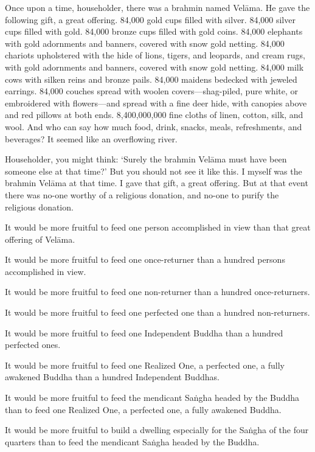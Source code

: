 \documentclass[12pt,openany]{book}%
\begin{document}
Once upon a time, householder, there was a brahmin named \textsanskrit{Velāma}. He gave the following gift, a great offering. 84,000 gold cups filled with silver. 84,000 silver cups filled with gold. 84,000 bronze cups filled with gold coins. 84,000 elephants with gold adornments and banners, covered with snow gold netting. 84,000 chariots upholstered with the hide of lions, tigers, and leopards, and cream rugs, with gold adornments and banners, covered with snow gold netting. 84,000 milk cows with silken reins and bronze pails. 84,000 maidens bedecked with jeweled earrings. 84,000 couches spread with woolen covers—shag-piled, pure white, or embroidered with flowers—and spread with a fine deer hide, with canopies above and red pillows at both ends. 8,400,000,000 fine cloths of linen, cotton, silk, and wool. And who can say how much food, drink, snacks, meals, refreshments, and beverages? It seemed like an overflowing river. 

Householder, you might think: ‘Surely the brahmin \textsanskrit{Velāma} must have been someone else at that time?’ But you should not see it like this. I myself was the brahmin \textsanskrit{Velāma} at that time. I gave that gift, a great offering. But at that event there was no-one worthy of a religious donation, and no-one to purify the religious donation. 

It would be more fruitful to feed one person accomplished in view than that great offering of \textsanskrit{Velāma}. 

It would be more fruitful to feed one once-returner than a hundred persons accomplished in view. 

It would be more fruitful to feed one non-returner than a hundred once-returners. 

It would be more fruitful to feed one perfected one than a hundred non-returners. 

It would be more fruitful to feed one Independent Buddha than a hundred perfected ones. 

It would be more fruitful to feed one Realized One, a perfected one, a fully awakened Buddha than a hundred Independent Buddhas. 

It would be more fruitful to feed the mendicant \textsanskrit{Saṅgha} headed by the Buddha than to feed one Realized One, a perfected one, a fully awakened Buddha. 

It would be more fruitful to build a dwelling especially for the \textsanskrit{Saṅgha} of the four quarters than to feed the mendicant \textsanskrit{Saṅgha} headed by the Buddha. 
\end{document}
